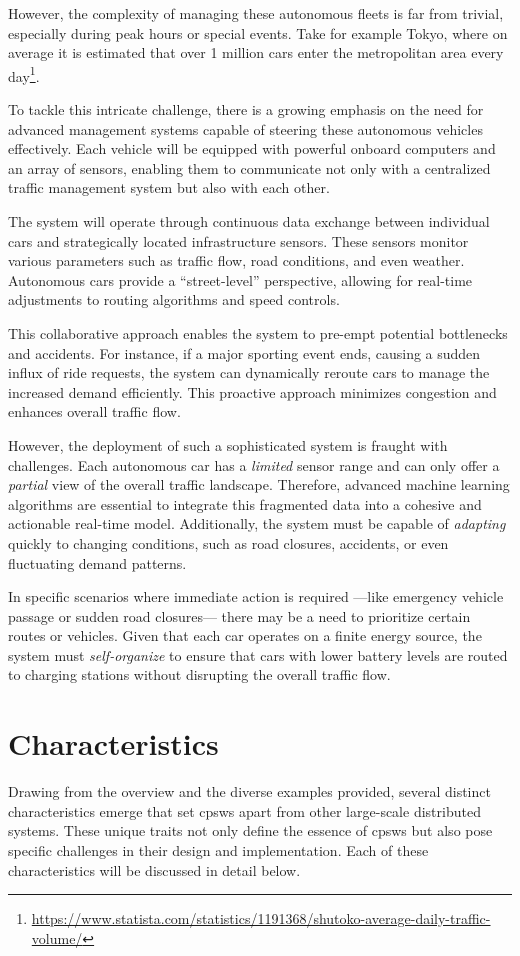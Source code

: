 However, the complexity of managing these autonomous fleets is far from trivial, 
 especially during peak hours or special events. 
%
Take for example Tokyo,
 where on average it is estimated that
 over 1 million cars enter the metropolitan area every day\footnote{\url{https://www.statista.com/statistics/1191368/shutoko-average-daily-traffic-volume/}}.

To tackle this intricate challenge, 
 there is a growing emphasis on the need for advanced management systems capable 
 of steering these autonomous vehicles effectively. 
 Each vehicle will be equipped with powerful onboard computers 
 and an array of sensors, 
 enabling them to communicate not only with a centralized traffic management system 
 but also with each other.

The system will operate through continuous data 
 exchange between individual cars 
 and strategically located infrastructure sensors. 
 These sensors monitor various parameters such as traffic flow, 
 road conditions, and even weather. 
 Autonomous cars provide a ``street-level'' perspective, 
 allowing for real-time adjustments to routing algorithms 
 and speed controls.

This collaborative approach enables the system to pre-empt potential bottlenecks and accidents. 
 For instance, if a major sporting event ends, 
 causing a sudden influx of ride requests, 
 the system can dynamically reroute cars to manage the increased demand efficiently. 
 This proactive approach minimizes congestion and enhances overall traffic flow.

However, the deployment of such a sophisticated system is fraught with challenges. 
 Each autonomous car has a \emph{limited} sensor range and can only offer a \emph{partial} view of the overall traffic landscape. 
 Therefore, advanced machine learning algorithms are essential to integrate this fragmented data into a cohesive and actionable real-time model. 
 Additionally, the system must be capable of \emph{adapting} quickly to changing conditions, such as road closures, accidents, or even fluctuating demand patterns.

In specific scenarios where immediate action is required
 ---like emergency vehicle passage or sudden road closures---
 there may be a need to prioritize certain routes or vehicles. 
 Given that each car operates on a finite energy source, 
 the system must \emph{self-organize} to ensure that cars with lower battery levels are routed to charging stations without disrupting the overall traffic flow.
\section{Characteristics}
Drawing from the overview and the diverse examples provided, 
 several distinct characteristics emerge that set \acp{cpsw} apart from other large-scale 
 distributed systems. 
% 
These unique traits not only define the essence of \acp{cpsw} but also pose specific challenges in their design and implementation. 
 Each of these characteristics will be discussed in detail below.

